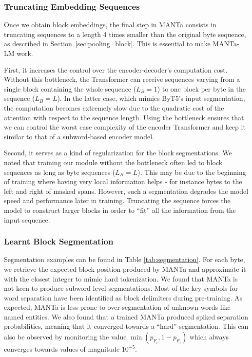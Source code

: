 \subsubsection{Truncating Embedding Sequences}
\label{sec:truncation}
Once we obtain block embeddings, the final step in MANTa consists in truncating sequences to a length 4 times smaller than the original byte sequence, as described in Section~\ref{sec:pooling_block}. This is essential to make MANTa-LM work.

First, it increases the control over the encoder-decoder's computation cost. Without this bottleneck, the Transformer can receive sequences varying from a single block containing the whole sequence ($L_B=1$) to one block per byte in the sequence ($L_B = L$). In the latter case, which mimics ByT5's input segmentation, the computation becomes extremely slow due to the quadratic cost  of the attention with respect to the sequence length. Using the bottleneck ensures that we can control the worst case complexity of the encoder Transformer and keep it similar to that of a subword-based encoder model.

Second, it serves as a kind of regularization for the block segmentations. We noted that training our module without the bottleneck often led to block sequences as long as byte sequences ($L_B=L$). This may be due to the beginning of training where having very local information helps - for instance bytes to the left and right of masked spans. However, such a segmentation degrades the model speed and performance later in training. Truncating the sequence forces the model to construct larger blocks in order to ``fit'' all the information from the input sequence.

\subsubsection{Learnt Block Segmentation}
Segmentation examples can be found in Table \ref{tab:segmentation}. For each byte, we retrieve the expected block position produced by MANTa and approximate it with the closest integer to mimic hard tokenization. We found that MANTa is not keen to produce subword level segmentations. Most of the key symbols for word separation have been identified as block delimiters during pre-training. As expected, MANTa is less prone to over-segmentation of unknown words like named entities. We also found that a trained MANTa produced spiked separation probabilities, meaning that it converged towards a ``hard'' segmentation. This can also be observed by monitoring the value $\min(p_{F_i}, 1 - p_{F_i})$ which always converges towards values of magnitude $10^{-5}$.



